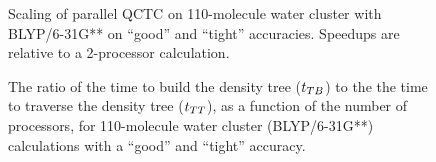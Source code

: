 \commentoutA{\documentclass[prl,aps,twocolumn,twocolumngrid,superbib]{revtex4}}
\begin{document}
\begin{figure}[t]
\caption{ 
Scaling of parallel QCTC on 110-molecule water cluster with
BLYP/6-31G** on ``good'' and ``tight'' accuracies.  Speedups are
relative to a 2-processor calculation.  }
\label{fig:110WaterOnGoodAndTight}
\end{figure}

\begin{figure}[t]
\caption{ 
The ratio of the time to build the density tree ($t_{TB}$) to the the
time to traverse the density tree ($t_{TT}$), as a function of the
number of processors, for 110-molecule water cluster (BLYP/6-31G**)
calculations with a ``good'' and ``tight'' accuracy.  }
\label{fig:NProc_TRatio_110H2O_GoodAndTight}
\end{figure}
\end{document}
